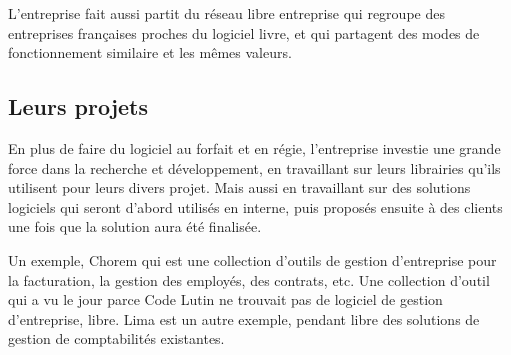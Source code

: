 L'entreprise fait aussi partit du réseau libre entreprise qui regroupe des
entreprises françaises proches du logiciel livre, et qui partagent des modes de
fonctionnement similaire et les mêmes valeurs.


\subsection{Leurs projets}

En plus de faire du logiciel au forfait et en régie, l'entreprise investie une
grande force dans la recherche et développement, en travaillant sur leurs librairies
qu'ils utilisent pour leurs divers projet. Mais aussi en travaillant sur des
solutions logiciels qui seront d'abord utilisés en interne, puis proposés
ensuite à des clients une fois que la solution aura été finalisée.

Un exemple, Chorem qui est une collection d'outils de gestion d'entreprise
pour la facturation, la gestion des employés, des contrats, etc. Une collection
d'outil qui a vu le jour parce Code Lutin ne trouvait pas de logiciel de gestion
d'entreprise, libre. Lima est un autre exemple, pendant libre des solutions de
gestion de comptabilités existantes.
